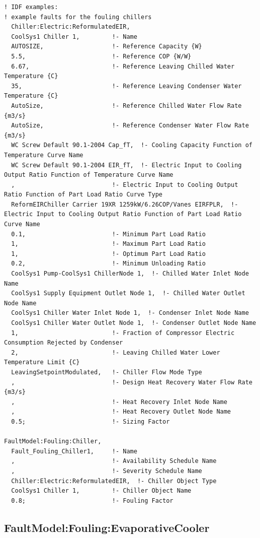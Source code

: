 \begin{lstlisting}
! IDF examples:
! example faults for the fouling chillers
  Chiller:Electric:ReformulatedEIR,
  CoolSys1 Chiller 1,         !- Name
  AUTOSIZE,                   !- Reference Capacity {W}
  5.5,                        !- Reference COP {W/W}
  6.67,                       !- Reference Leaving Chilled Water Temperature {C}
  35,                         !- Reference Leaving Condenser Water Temperature {C}
  AutoSize,                   !- Reference Chilled Water Flow Rate {m3/s}
  AutoSize,                   !- Reference Condenser Water Flow Rate {m3/s}
  WC Screw Default 90.1-2004 Cap_fT,  !- Cooling Capacity Function of Temperature Curve Name
  WC Screw Default 90.1-2004 EIR_fT,  !- Electric Input to Cooling Output Ratio Function of Temperature Curve Name
  ,                           !- Electric Input to Cooling Output Ratio Function of Part Load Ratio Curve Type
  ReformEIRChiller Carrier 19XR 1259kW/6.26COP/Vanes EIRFPLR,  !- Electric Input to Cooling Output Ratio Function of Part Load Ratio Curve Name
  0.1,                        !- Minimum Part Load Ratio
  1,                          !- Maximum Part Load Ratio
  1,                          !- Optimum Part Load Ratio
  0.2,                        !- Minimum Unloading Ratio
  CoolSys1 Pump-CoolSys1 ChillerNode 1,  !- Chilled Water Inlet Node Name
  CoolSys1 Supply Equipment Outlet Node 1,  !- Chilled Water Outlet Node Name
  CoolSys1 Chiller Water Inlet Node 1,  !- Condenser Inlet Node Name
  CoolSys1 Chiller Water Outlet Node 1,  !- Condenser Outlet Node Name
  1,                          !- Fraction of Compressor Electric Consumption Rejected by Condenser
  2,                          !- Leaving Chilled Water Lower Temperature Limit {C}
  LeavingSetpointModulated,   !- Chiller Flow Mode Type
  ,                           !- Design Heat Recovery Water Flow Rate {m3/s}
  ,                           !- Heat Recovery Inlet Node Name
  ,                           !- Heat Recovery Outlet Node Name
  0.5;                        !- Sizing Factor

FaultModel:Fouling:Chiller,
  Fault_Fouling_Chiller1,     !- Name
  ,                           !- Availability Schedule Name
  ,                           !- Severity Schedule Name
  Chiller:Electric:ReformulatedEIR,  !- Chiller Object Type
  CoolSys1 Chiller 1,         !- Chiller Object Name
  0.8;                        !- Fouling Factor
\end{lstlisting}


\subsection{FaultModel:Fouling:EvaporativeCooler}\label{faultmodelfoulingevapcooler}

